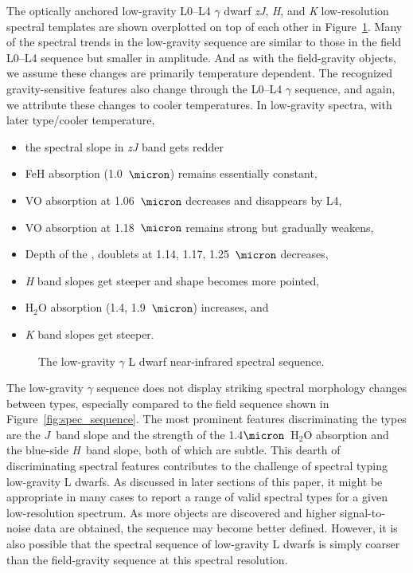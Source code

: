 \documentclass[12pt]{aastex6}
\begin{document}
The optically anchored low-gravity L0--L4 $\gamma$ dwarf \emph{zJ}, \emph{H}, and \emph{K} low-resolution spectral templates are shown overplotted on top of each other in Figure~\ref{fig:lg_sequence}.
Many of the spectral trends in the low-gravity sequence are similar to those in the field L0--L4 sequence but smaller in amplitude. And as with the field-gravity objects, we assume these changes are primarily temperature dependent. The recognized gravity-sensitive features also change through the L0--L4 $\gamma$ sequence, and again, we attribute these changes to cooler temperatures.
In low-gravity spectra, with later type/cooler temperature,
\begin{itemize}
\item the spectral slope in \emph{zJ} band gets redder
\item FeH absorption (1.0~$\micron$) remains essentially constant,
\item VO absorption at 1.06~$\micron$ decreases and disappears by L4,
\item VO absorption at 1.18~$\micron$ remains strong but gradually weakens,
\item Depth of the ,  doublets at 1.14, 1.17, 1.25~$\micron$ decreases,
\item \emph{H} band slopes get steeper and shape becomes more pointed,
\item H$_2$O absorption (1.4, 1.9~$\micron$) increases, and
\item \emph{K} band slopes get steeper.
\end{itemize}


\begin{figure}
  \caption{The low-gravity $\gamma$ L dwarf near-infrared spectral sequence.}
  \label{fig:lg_sequence}
\end{figure}

The low-gravity $\gamma$ sequence does not display striking spectral morphology changes between types, especially compared to the field sequence shown in Figure~\ref{fig:spec_sequence}.
The most prominent features discriminating the types are the $J$~band slope and the strength of the 1.4$\micron$~H$_2$O absorption and the blue-side \emph{H}~band slope, both of which are subtle.
This dearth of discriminating spectral features contributes to the challenge of spectral typing low-gravity L dwarfs.
As discussed in later sections of this paper, it might be appropriate in many cases to report a range of valid spectral types for a given low-resolution spectrum.
As more objects are discovered and higher signal-to-noise data are obtained, the sequence may become better defined.
However, it is also possible that the spectral sequence of low-gravity L dwarfs is simply coarser than the field-gravity sequence at this spectral resolution.
\end{document}
